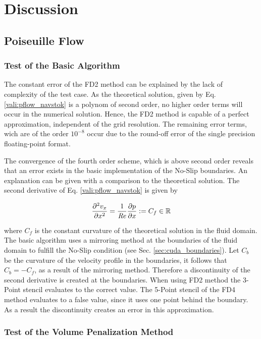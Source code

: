 \section{Discussion}
\subsection{Poiseuille Flow}
\subsubsection{Test of the Basic Algorithm}

The constant error of the FD2 method can be explained by the lack of complexity of the test case.
As the theoretical solution, given by Eq. \ref{vali:pflow_navstok} is a polynom of second order,
no higher order terms will occur in the numerical solution.
Hence, the FD2 method is capable of a perfect approximation, independent of the
grid resolution. The remaining error terms, wich are of the order $10^{-8}$
occur due to the round-off error of the single precision floating-point format.

The convergence of the fourth order scheme, which is above second order
reveals that an error exists in the basic implementation of the No-Slip boundaries.
An explanation can be given with a comparison to the theoretical solution.
The second derivative of Eq. \ref{vali:pflow_navstok}  is given by

\begin{align}
    \pdn[^2 v_x]{x^2} = \frac{1}{\Rey}\pdn[p]{x} := C_f\in\mathbb{R}
\end{align}

where $C_f$ is the constant curvature of the theoretical solution in the fluid domain.
The basic algorithm uses a mirroring method at the boundaries of the fluid domain to fulfill the No-Slip condition (see Sec. \ref{sec:cuda_boundaries}).
Let $C_b$ be the curvature of the velocity profile in the boundaries, it follows that $C_b = - C_f$, as a result of the mirroring method.
Therefore a discontinuity of the second derivative is created at the boundaries.
When using FD2 method the 3-Point stencil evaluates to the correct value.
The 5-Point stencil of the FD4 method evaluates to a false value, since it uses one point behind the boundary.
As a result the discontinuity creates an error in this approximation.


\subsubsection{Test of the Volume Penalization Method}

